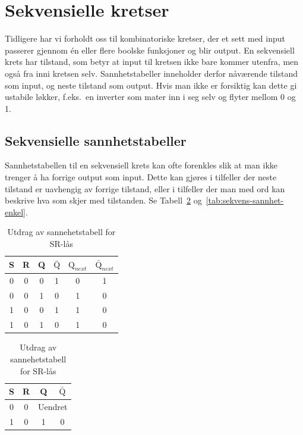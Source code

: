\documentclass[12pt,a4paper,norsk]{article}
\begin{document}
\section{Sekvensielle kretser}
Tidligere har vi forholdt oss til kombinatoriske kretser, der et sett med input
passerer gjennom én eller flere boolske funksjoner og blir output. En sekvensiell
krets har tilstand, som betyr at input til kretsen ikke bare kommer utenfra, men
også fra inni kretsen selv. Sannhetstabeller inneholder derfor nåværende tilstand
som input, og neste tilstand som output. Hvis man ikke er forsiktig kan dette gi
ustabile løkker, f.eks.\ en inverter som mater inn i seg selv og flyter mellom 0
og 1.

\subsection{Sekvensielle sannhetstabeller}
Sannhetstabellen til en sekvensiell krets kan ofte forenkles slik at man ikke
trenger å ha forrige output som input. Dette kan gjøres i tilfeller der neste
tilstand er uavhengig av forrige tilstand, eller i tilfeller der man med ord kan
beskrive hva som skjer med tilstanden. Se
Tabell~\ref{tab:sekvens-sannhet-vanskelig} og~\ref{tab:sekvens-sannhet-enkel}.

\begin{table}[hbt!]
  \centering
  \begin{minipage}{0.55\textwidth}
    \centering
    \begin{tabular}{cccc|cc}
      \toprule
      S & R & Q & $\bar{\text{Q}}$ & $\text{Q}_{next}$ & $\bar{\text{Q}}_{next}$ \\
      \midrule
      0 & 0 & 0 & 1 & 0 & 1 \\
      0 & 0 & 1 & 0 & 1 & 0 \\
      \midrule
      1 & 0 & 0 & 1 & 1 & 0 \\
      1 & 0 & 1 & 0 & 1 & 0 \\
      \bottomrule
    \end{tabular}
    \caption{Utdrag av sannehetstabell for SR-lås\label{tab:sekvens-sannhet-vanskelig}}
  \end{minipage}
  \begin{minipage}{.4\textwidth}
    \centering
    \begin{tabular}{cc|cc}
      \toprule
      S & R & Q & $\bar{\text{Q}}$  \\
      \midrule
      0 & 0 & \multicolumn{2}{c}{Uendret} \\
      \midrule
      1 & 0 & 1 & 0 \\
      \bottomrule
    \end{tabular}
  \end{minipage}
\end{table}
\end{document}
